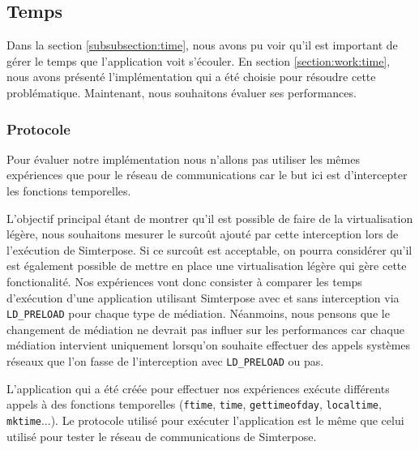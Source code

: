 \subsection{Temps}
\label{section:temps}

Dans la section \ref{subsubsection:time}, nous avons pu voir qu'il est important de gérer le temps que l'application voit s'écouler. En section \ref{section:work:time}, nous avons présenté l'implémentation qui a été choisie pour résoudre cette problématique. Maintenant, nous souhaitons évaluer ses performances.

\subsubsection{Protocole}
Pour évaluer notre implémentation nous n'allons pas utiliser les mêmes expériences que pour le réseau de communications car le but ici est d'intercepter les fonctions temporelles.

L'objectif principal étant de montrer qu'il est possible de faire de la virtualisation légère, nous souhaitons mesurer le surcoût ajouté par cette interception lors de l'exécution de Simterpose. Si ce surcoût est acceptable, on pourra considérer qu'il est également possible de mettre en place une virtualisation légère qui gère cette fonctionalité. Nos expériences vont donc consister à comparer les temps d'exécution d'une application utilisant Simterpose avec et sans interception via \texttt{LD\_PRELOAD} pour chaque type de médiation. Néanmoins, nous pensons que le changement de médiation ne devrait pas influer sur les performances car chaque médiation intervient uniquement lorsqu'on souhaite effectuer des appels systèmes réseaux que l'on fasse de l'interception avec \texttt{LD\_PRELOAD} ou pas.

L'application qui a été créée pour effectuer nos expériences exécute différents appels à des fonctions temporelles (\texttt{ftime}, \texttt{time}, \texttt{gettimeofday}, \texttt{localtime}, \texttt{mktime}...). Le protocole utilisé pour exécuter l'application est le même que celui utilisé pour tester le réseau de communications de Simterpose.

